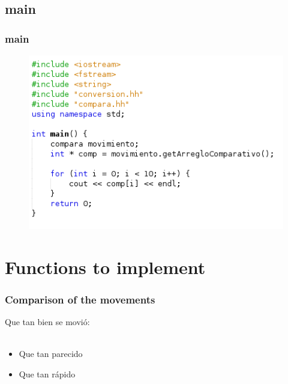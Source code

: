 \documentclass{beamer}
\begin{document}

\subsection{main}

\begin{frame}
\frametitle{main}

\begin{figure}
\includegraphics[width=0.7\linewidth]{23.png}
\end{figure}


\end{frame}

\section{Functions to implement}

\begin{frame}
\frametitle{Comparison of the movements}

Que tan bien se movi\'o:
\\~\\
\begin{itemize}
\item Que tan parecido
\item Que tan r\'apido
\end{itemize}


\end{frame}

\end{document}
